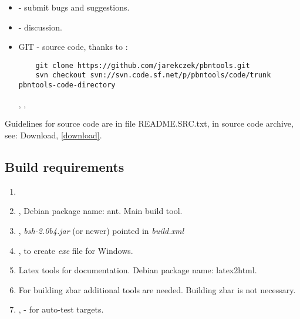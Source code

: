 \documentclass[polish,a4paper,11pt,oneside]{article}
\begin{document}
\begin{itemize}
\item
   -
  submit bugs and suggestions.
  
\item
   -
  discussion.
  
\item
  GIT - source code, thanks to 
  :
  \begin{verbatim}
    git clone https://github.com/jarekczek/pbntools.git
    svn checkout svn://svn.code.sf.net/p/pbntools/code/trunk pbntools-code-directory
  \end{verbatim}

  ,
  , 

\end{itemize}

Guidelines for source code are in file README.SRC.txt,
in source code archive, see: Download, \ref{download}.

\subsection{Build requirements}

\begin{enumerate}
\item
  \javajdk
\item
  , Debian package name: ant.
  Main build tool.
\item
  ,
  {\em bsh-2.0b4.jar} (or newer) pointed in {\em build.xml}
\item
  ,
  to create {\em exe} file for Windows.
\item
  Latex tools for documentation. Debian package name: latex2html.
\item
  For building zbar additional tools are needed.
  Building zbar is not necessary.
\item
  ,
  - for auto-test targets.


\end{enumerate}
\end{document}

